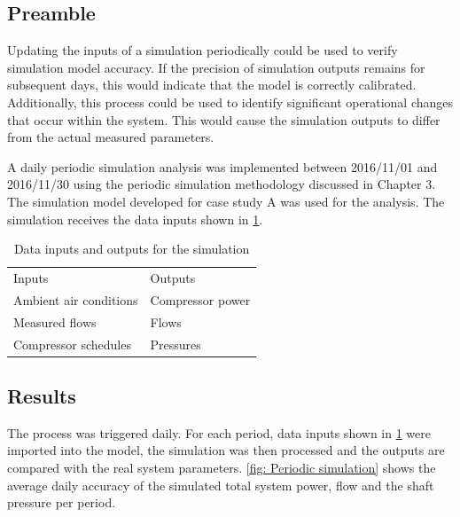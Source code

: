 	\subsection{Preamble}
	Updating the inputs of a simulation periodically could be used to verify simulation model accuracy. If the precision of simulation outputs remains for subsequent days, this would indicate that the model is correctly calibrated. Additionally, this process could be used to identify significant operational changes that occur within the system. This would cause the simulation outputs to differ from the actual measured parameters. 
	\par 
	A daily periodic simulation  analysis was implemented between 2016/11/01 and 2016/11/30 using the periodic simulation methodology discussed in Chapter 3. The simulation model developed for case study A was used for the analysis. The simulation receives the data inputs shown in \cref{table: Periodic inputs/outputs}.
	\begin{table}[h]
		\centering
		\begin{tabular}{ll}
			\hline
			Inputs \hspace*{4cm}    &Outputs \hspace*{4cm}    \\  \hhline{==}
			Ambient air conditions&Compressor power \\
			Measured flows& Flows \\
			Compressor schedules& Pressures \\
			\hline
		\end{tabular}
		\caption{Data inputs and outputs for the simulation}
		\label{table: Periodic inputs/outputs}
	\end{table}

\subsection{Results}

 The process was triggered daily. For each period, data inputs shown in \cref{table: Periodic inputs/outputs} were imported into the model, the simulation was then processed and the outputs are compared with the real system parameters. \cref{fig: Periodic simulation} shows the average daily accuracy of the simulated total system power, flow and the shaft pressure per period.
	     \par 
     
